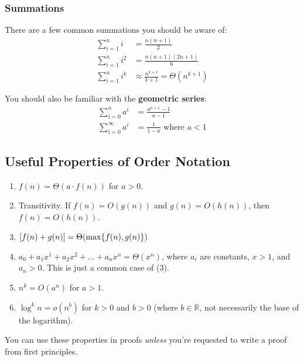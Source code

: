 \documentclass[]{article}
\theoremstyle{definition}
\DeclarePairedDelimiter{\set}{\lbrace}{\rbrace}
\begin{document}
			\subsubsection{Summations}
				There are a few common summations you should be aware of:
				\begin{align*}
					\sum_{i = 1}^{n} i &= \frac{n(n+1)}{2} \\
					\sum_{i = 1}^{n} i^2 &= \frac{n(n+1)(2n+1)}{6} \\
					\sum_{i = 1}^{n} i^k &\approx \frac{n^{k + 1}}{k + 1} = \Theta(n^{k + 1})
				\end{align*}

				You should also be familiar with the \textbf{geometric series}:
				\begin{align*}
					\sum_{i = 0}^{n} a^i &= \frac{a^{n + 1} - 1}{a - 1} \\
					\sum_{i = 0}^{\infty} a^i &= \frac{1}{1 - a} \text{ where } a < 1
				\end{align*}
		\subsection{Useful Properties of Order Notation}
			\begin{enumerate}
				\item $f(n) = \Theta(a \cdot f(n))$ for $a > 0$.
				\item Transitivity. If $f(n) = O(g(n))$ and $g(n) = O(h(n))$, then $f(n) = O(h(n))$.
				\item $[f(n) + g(n)] = \Theta(\max\set{f(n), g(n) })$
				\item $a_0 + a_1 x^1 + a_2 x^2 + \ldots + a_n x^n = \Theta(x^n)$, where $a_i$ are constants, $x > 1$, and $a_n > 0$. This is just a common case of (3).
				\item $n^k = O(a^n)$ for $a > 1$.
				\item $\log^{k} n = o(n^b)$ for $k > 0$ and $b > 0$ (where $b \in \mathbb{R}$, not necessarily the base of the logarithm).
			\end{enumerate}

			You can use these properties in proofs \emph{unless} you're requested to write a proof from first principles.
\end{document}
